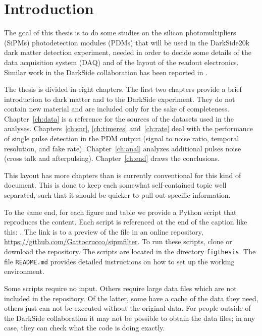 \chapter*{Introduction}

The goal of this thesis is to do some studies on the silicon photomultipliers
(SiPMs) photodetection modules (PDMs) that will be used in the DarkSide20k dark
matter detection experiment, needed in order to decide some details of the data
acquisition system (DAQ) and of the layout of the readout electronics. Similar
work in the DarkSide collaboration has been reported in
\cite[ch.~3,~5]{savarese2018}.


The thesis is divided in eight chapters. The first two chapters provide a brief
introduction to dark matter and to the DarkSide experiment. They do not contain
new material and are included only for the sake of completeness.
Chapter~\ref{ch:data} is a reference for the sources of the datasets used in
the analyses. Chapters~\ref{ch:snr}, \ref{ch:timeres} and~\ref{ch:rate} deal
with the performance of single pulse detection in the PDM output (signal to
noise ratio, temporal resolution, and fake rate). Chapter~\ref{ch:anal}
analyzes additional pulses noise (cross talk and afterpulsing).
Chapter~\ref{ch:end} draws the conclusions.

This layout has more chapters than is currently conventional for this kind of
document. This is done to keep each somewhat self-contained topic well
separated, such that it should be quicker to pull out specific information.

To the same end, for each figure and table we provide a Python script that
reproduces the content. Each script is referenced at the end of the caption
like this: . The link is to a preview of the file in an
online repository, \url{https://github.com/Gattocrucco/sipmfilter}. To run
these scripts, clone or download the repository. The scripts are located in the
directory \nolinkurl{figthesis}. The file \nolinkurl{README.md} provides
detailed instructions on how to set up the working environment.

Some scripts require no input. Others require large data files which are not
included in the repository. Of the latter, some have a cache of the data they
need, others just can not be executed without the original data. For people
outside of the DarkSide collaboration it may not be possible to obtain the data
files; in any case, they can check what the code is doing exactly.

